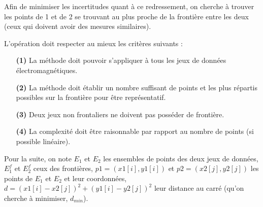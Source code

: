 \documentclass[12pt]{article}
\begin{document}
    Afin de minimiser les incertitudes quant à ce redressement, on cherche à trouver les points de 1 et de 2 se trouvant au plus proche de la frontière entre les deux (ceux qui doivent avoir des mesures similaires).

    L'opération doit respecter au mieux les critères suivants :
    \begin{enumerate}
        \item[\textbf{(1)}] La méthode doit pouvoir s'appliquer à tous les jeux de données électromagnétiques.
        \item[\textbf{(2)}] La méthode doit établir un nombre suffisant de points et les plus répartis possibles sur la frontière pour être représentatif.
        \item[\textbf{(3)}] Deux jeux non frontaliers ne doivent pas posséder de frontière.
        \item[\textbf{(4)}] La complexité doit être raisonnable par rapport au nombre de points (si possible linéaire).
    \end{enumerate}

    Pour la suite, on note $E_1$ et $E_2$ les ensembles de points des deux jeux de données, $E_1^f$ et $E_2^f$ ceux des frontières, $p1 = (x1[i], y1[i])$ et $p2 = (x2[j], y2[j])$ les points de $E_1$ et $E_2$ et leur coordonnées, $d = (x1[i]-x2[j])^{2} + (y1[i]-y2[j])^{2}$ leur distance au carré (qu'on cherche à minimiser, $d_{min}$).\\
\end{document}
